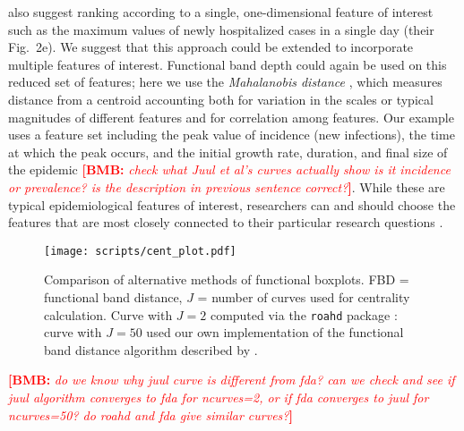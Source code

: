 \documentclass[12pt]{article}
\newcommand{\comment}{\showcomment}
\newcommand{\showcomment}[3]{\textcolor{#1}{\textbf{[#2: }\textsl{#3}\textbf{]}}}
\newcommand{\bmb}[1]{\comment{red}{BMB}{#1}}
\theoremstyle{definition} %
\begin{document}
\cite{juul2021fixed} also suggest ranking according to a single, one-dimensional feature of interest such as the maximum values of newly hospitalized cases in a single day (their Fig.~2e). We suggest that this approach could be extended to incorporate multiple features of interest. Functional band depth could again be used on this reduced set of features; here we use the \emph{Mahalanobis distance} \citep{mahalanobis1936generalized}, which measures distance from a centroid accounting both for variation in the scales or typical magnitudes of different features and for correlation among features.
Our example uses a feature set including the peak value of incidence (new infections), the time at which the peak occurs, and the initial growth rate, duration, and final size of the epidemic \bmb{check what Juul et al's curves actually show is it incidence or prevalence? is the description in previous sentence correct?}. While these are typical epidemiological features of interest, researchers can and should choose the features that are most closely connected to their particular research questions \citep{probert2016decision}.

\begin{figure}[h!]
  \centering
  \texttt{[image: scripts/cent\_plot.pdf]}
  \caption{Comparison of alternative methods of functional boxplots. FBD = functional band distance, $J$ = number of curves used for centrality calculation. Curve with $J=2$ computed via the \texttt{roahd} package \citep{roahd}: curve with $J=50$ used our own implementation of the functional band distance algorithm described by \cite{juul2021fixed}.
  }
  \label{p.a}
\end{figure}

\bmb{do we know why juul curve is different from fda? can we check and see if juul algorithm converges to fda for ncurves=2, or if fda converges to juul for ncurves=50? do roahd and fda give similar curves?}
  

\end{document}
